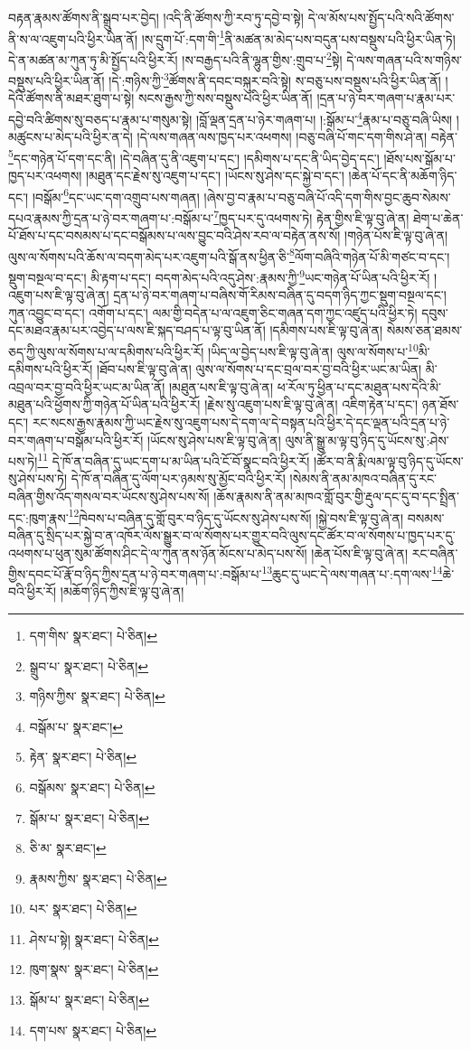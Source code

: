 བརྟན་རྣམས་ཚོགས་ནི་སྒྲུབ་པར་བྱེད། །འདི་ནི་ཚོགས་ཀྱི་རབ་ཏུ་དབྱེ་བ་སྟེ། དེ་ལ་མོས་པས་སྤྱོད་པའི་སའི་ཚོགས་ནི་ས་ལ་འཇུག་པའི་ཕྱིར་ཡིན་ནོ། །ས་དྲུག་པོ་:དག་གི་\footnote{དག་གིས་  སྣར་ཐང་།  པེ་ཅིན། }ནི་མཚན་མ་མེད་པས་བདུན་པས་བསྡུས་པའི་ཕྱིར་ཡིན་ཏེ། དེ་ན་མཚན་མ་ཀུན་ཏུ་མི་སྤྱོད་པའི་ཕྱིར་རོ། །ས་བརྒྱད་པའི་ནི་ལྷུན་གྱིས་:གྲུབ་པ་\footnote{སྒྲུབ་པ་  སྣར་ཐང་།  པེ་ཅིན། }སྟེ། དེ་ལས་གཞན་པའི་ས་གཉིས་བསྡུས་པའི་ཕྱིར་ཡིན་ནོ། །དེ་:གཉིས་ཀྱི་\footnote{གཉིས་ཀྱིས་  སྣར་ཐང་།  པེ་ཅིན། }ཚོགས་ནི་དབང་བསྐུར་བའི་སྟེ། ས་བཅུ་པས་བསྡུས་པའི་ཕྱིར་ཡིན་ནོ། །དེའི་ཚོགས་ནི་མཐར་ཐུག་པ་སྟེ། སངས་རྒྱས་ཀྱི་སས་བསྡུས་པའི་ཕྱིར་ཡིན་ནོ། །དྲན་པ་ཉེ་བར་གཞག་པ་རྣམ་པར་དབྱེ་བའི་ཚིགས་སུ་བཅད་པ་རྣམ་པ་གསུམ་སྟེ། །བློ་ལྡན་དྲན་པ་ཉེར་གཞག་པ། །:སྒོམ་པ་\footnote{བསྒོམ་པ་  སྣར་ཐང་། }རྣམ་པ་བཅུ་བཞི་ཡིས། །མཚུངས་པ་མེད་པའི་ཕྱིར་ན་དེ། །དེ་ལས་གཞན་ལས་ཁྱད་པར་འཕགས། །བཅུ་བཞི་པོ་གང་དག་གིས་ཤེ་ན། བརྟེན་\footnote{རྟེན་  སྣར་ཐང་།  པེ་ཅིན། }དང་གཉེན་པོ་དག་དང་ནི། །དེ་བཞིན་དུ་ནི་འཇུག་པ་དང་། །དམིགས་པ་དང་ནི་ཡིད་བྱེད་དང་། །ཐོས་པས་སྒོམ་པ་ཁྱད་པར་འཕགས། །མཐུན་དང་རྗེས་སུ་འཇུག་པ་དང་། །ཡོངས་སུ་ཤེས་དང་སྐྱེ་བ་དང་། །ཆེན་པོ་དང་ནི་མཆོག་ཉིད་དང་། །བསྒོམ་\footnote{བསྒོམས་  སྣར་ཐང་།  པེ་ཅིན། }དང་ཡང་དག་འགྲུབ་པས་གཞན། །ཞེས་བྱ་བ་རྣམ་པ་བཅུ་བཞི་པོ་འདི་དག་གིས་བྱང་ཆུབ་སེམས་དཔའ་རྣམས་ཀྱི་དྲན་པ་ཉེ་བར་གཞག་པ་:བསྒོམ་པ་\footnote{སྒོམ་པ་  སྣར་ཐང་།  པེ་ཅིན། }ཁྱད་པར་དུ་འཕགས་ཏེ། རྟེན་གྱིས་ཇི་ལྟ་བུ་ཞེ་ན། ཐེག་པ་ཆེན་པོ་ཐོས་པ་དང་བསམས་པ་དང་བསྒོམས་པ་ལས་བྱུང་བའི་ཤེས་རབ་ལ་བརྟེན་ནས་སོ། །གཉེན་པོས་ཇི་ལྟ་བུ་ཞེ་ན། ལུས་ལ་སོགས་པའི་ཆོས་ལ་བདག་མེད་པར་འཇུག་པའི་སྒོ་ནས་ཕྱིན་ཅི་\footnote{ཅི་མ་  སྣར་ཐང་། }ལོག་བཞིའི་གཉེན་པོ་མི་གཙང་བ་དང་། སྡུག་བསྔལ་བ་དང་། མི་རྟག་པ་དང་། བདག་མེད་པའི་འདུ་ཤེས་:རྣམས་ཀྱི་\footnote{རྣམས་ཀྱིས་  སྣར་ཐང་།  པེ་ཅིན། }ཡང་གཉེན་པོ་ཡིན་པའི་ཕྱིར་རོ། །འཇུག་པས་ཇི་ལྟ་བུ་ཞེ་ན། དྲན་པ་ཉེ་བར་གཞག་པ་བཞིས་གོ་རིམས་བཞིན་དུ་བདག་ཉིད་ཀྱང་སྡུག་བསྔལ་དང་། ཀུན་འབྱུང་བ་དང་། འགོག་པ་དང་། ལམ་གྱི་བདེན་པ་ལ་འཇུག་ཅིང་གཞན་དག་ཀྱང་འཛུད་པའི་ཕྱིར་ཏེ། དབུས་དང་མཐའ་རྣམ་པར་འབྱེད་པ་ལས་ཇི་སྐད་བཤད་པ་ལྟ་བུ་ཡིན་ནོ། །དམིགས་པས་ཇི་ལྟ་བུ་ཞེ་ན། སེམས་ཅན་ཐམས་ཅད་ཀྱི་ལུས་ལ་སོགས་པ་ལ་དམིགས་པའི་ཕྱིར་རོ། །ཡིད་ལ་བྱེད་པས་ཇི་ལྟ་བུ་ཞེ་ན། ལུས་ལ་སོགས་པ་\footnote{པར་  སྣར་ཐང་།  པེ་ཅིན། }མི་དམིགས་པའི་ཕྱིར་རོ། །ཐོབ་པས་ཇི་ལྟ་བུ་ཞེ་ན། ལུས་ལ་སོགས་པ་དང་བྲལ་བར་བྱ་བའི་ཕྱིར་ཡང་མ་ཡིན། མི་འབྲལ་བར་བྱ་བའི་ཕྱིར་ཡང་མ་ཡིན་ནོ། །མཐུན་པས་ཇི་ལྟ་བུ་ཞེ་ན། ཕ་རོལ་ཏུ་ཕྱིན་པ་དང་མཐུན་པས་དེའི་མི་མཐུན་པའི་ཕྱོགས་ཀྱི་གཉེན་པོ་ཡིན་པའི་ཕྱིར་རོ། །རྗེས་སུ་འཇུག་པས་ཇི་ལྟ་བུ་ཞེ་ན། འཇིག་རྟེན་པ་དང་། ཉན་ཐོས་དང་། རང་སངས་རྒྱས་རྣམས་ཀྱི་ཡང་རྗེས་སུ་འཇུག་པས་དེ་དག་ལ་དེ་བསྟན་པའི་ཕྱིར་དེ་དང་ལྡན་པའི་དྲན་པ་ཉེ་བར་གཞག་པ་བསྒོམ་པའི་ཕྱིར་རོ། །ཡོངས་སུ་ཤེས་པས་ཇི་ལྟ་བུ་ཞེ་ན། ལུས་ནི་སྒྱུ་མ་ལྟ་བུ་ཉིད་དུ་ཡོངས་སུ་:ཤེས་པས་ཏེ།\footnote{ཤེས་པ་སྟེ།  སྣར་ཐང་།  པེ་ཅིན། } དེ་ཁོ་ན་བཞིན་དུ་ཡང་དག་པ་མ་ཡིན་པའི་ངོ་བོ་སྣང་བའི་ཕྱིར་རོ། །ཚོར་བ་ནི་རྨི་ལམ་ལྟ་བུ་ཉིད་དུ་ཡོངས་སུ་ཤེས་པས་ཏེ། དེ་ཁོ་ན་བཞིན་དུ་ལོག་པར་ཉམས་སུ་མྱོང་བའི་ཕྱིར་རོ། །སེམས་ནི་ནམ་མཁའ་བཞིན་དུ་རང་བཞིན་གྱིས་འོད་གསལ་བར་ཡོངས་སུ་ཤེས་པས་སོ། །ཆོས་རྣམས་ནི་ནམ་མཁའ་གློ་བུར་གྱི་རྡུལ་དང་དུ་བ་དང་སྤྲིན་དང་:ཁུག་རྣས་\footnote{ཁུག་སྣས་  སྣར་ཐང་།  པེ་ཅིན། }ཁེབས་པ་བཞིན་དུ་གློ་བུར་བ་ཉིད་དུ་ཡོངས་སུ་ཤེས་པས་སོ། །སྐྱེ་བས་ཇི་ལྟ་བུ་ཞེ་ན། བསམས་བཞིན་དུ་སྲིད་པར་སྐྱེ་བ་ན་འཁོར་ལོས་སྒྱུར་བ་ལ་སོགས་པར་གྱུར་བའི་ལུས་དང་ཚོར་བ་ལ་སོགས་པ་ཁྱད་པར་དུ་འཕགས་པ་ཕུན་སུམ་ཚོགས་ཤིང་དེ་ལ་ཀུན་ནས་ཉོན་མོངས་པ་མེད་པས་སོ། །ཆེན་པོས་ཇི་ལྟ་བུ་ཞེ་ན། རང་བཞིན་གྱིས་དབང་པོ་རྣོ་བ་ཉིད་ཀྱིས་དྲན་པ་ཉེ་བར་གཞག་པ་:བསྒོམ་པ་\footnote{སྒོམ་པ་  སྣར་ཐང་།  པེ་ཅིན། }ཆུང་དུ་ཡང་དེ་ལས་གཞན་པ་:དག་ལས་\footnote{དག་པས་  སྣར་ཐང་།  པེ་ཅིན། }ཆེ་བའི་ཕྱིར་རོ། །མཆོག་ཉིད་ཀྱིས་ཇི་ལྟ་བུ་ཞེ་ན། 